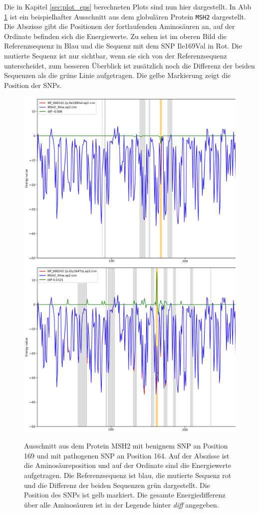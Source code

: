 Die in Kapitel \ref{sec:plot_eps} berechneten Plots sind nun hier dargestellt. In \ac{Abb} \ref{fig:comp_plot_MSH2} ist ein beispielhafter Ausschnitt aus dem globulären Protein \texttt{MSH2} dargestellt. Die Abszisse gibt die Positionen der fortlaufenden Aminosäuren an, auf der Ordinate befinden sich die Energiewerte. Zu sehen ist im oberen Bild die Referenzsequenz in Blau und die Sequenz mit dem \ac{SNP} Ile169Val in Rot. Die mutierte Sequenz ist nur sichtbar, wenn sie sich von der Referenzsequenz unterscheidet, zum besseren Überblick ist zusätzlich noch die Differenz der beiden Sequenzen als die grüne Linie aufgetragen. Die gelbe Markierung zeigt die Position der \ac{SNP}s. 
%
\begin{figure}
    \centering
    \includegraphics[width=.90\textwidth]{images/comp_plot_Ile169Val.png}
    \includegraphics[width=.90\textwidth]{images/comp_plot_Gly164Trp.png}
    \caption{Ausschnitt aus dem Protein MSH2 mit benignem \ac{SNP} an Position 169 und mit pathogenen \ac{SNP} an Position 164. Auf der Abszisse ist die Aminosäureposition und auf der Ordinate sind die Energiewerte aufgetragen. Die Referenzsequenz ist blau, die mutierte Sequenz rot und die Differenz der beiden Sequenzen grün dargestellt. Die Position des \ac{SNP}s ist gelb markiert. Die gesamte Energiedifferenz über alle Aminosäuren ist in der Legende hinter \emph{diff} angegeben.} 
    \label{fig:comp_plot_MSH2}
\end{figure}
